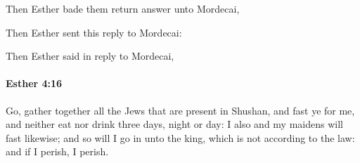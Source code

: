			\begin{versebox}
					\item[BHS] 
					\item[LXX] 
					\item[ASV] Then Esther bade them return answer unto Mordecai,
					\item[NIV] Then Esther sent this reply to Mordecai:
					\item[NRSV] Then Esther said in reply to Mordecai,
			\end{versebox}

		\paragraph{Esther 4:16} %
			\label{ESTHER-4-16}

			Go, gather together all the Jews that are present in Shushan, and fast ye for me, and neither eat nor drink three days, night or day: I also and my maidens will fast likewise; and so will I go in unto the king, which is not according to the law: and if I perish, I perish.


